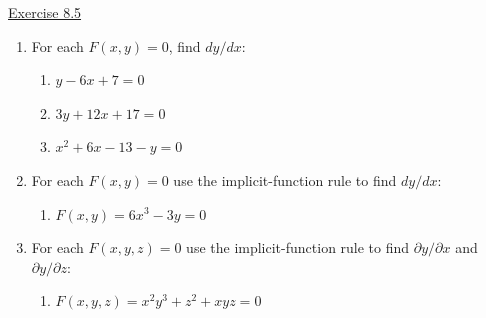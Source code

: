 \underline{Exercise 8.5}
\begin{enumerate}
\item[1.] For each $F(x,y)=0$, find $dy/dx$:
\begin{enumerate}
\item[(a)] $y-6x+7=0$
\item[(b)] $3y+12x+17=0$
\item[(c)] $x^{2}+6x-13-y=0$
\end{enumerate}

\item[2.] For each $F(x,y)=0$ use the implicit-function rule to find $dy/dx$:
\begin{enumerate}
\item[(d)] $F(x,y)=6x^{3}-3y=0$
\end{enumerate}

\item[3.] For each $F(x,y,z)=0$ use the implicit-function rule to find $\partial y/\partial x$ and $\partial y/\partial z$:
\begin{enumerate}
\item[(a)] $F(x,y,z)=x^{2}y^{3}+z^{2}+xyz=0$
\end{enumerate}

\end{enumerate}
